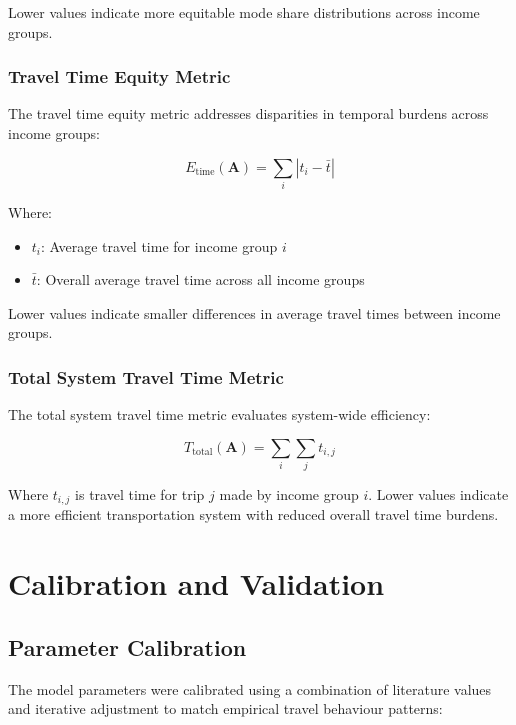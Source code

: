 Lower values indicate more equitable mode share distributions across income groups.

\subsubsection{Travel Time Equity Metric}
The travel time equity metric addresses disparities in temporal burdens across income groups:

\begin{equation}
E_{\text{time}}(\mathbf{A}) = \sum_{i} |t_i - \bar{t}|
\end{equation}

Where:
\begin{itemize}
    \item $t_i$: Average travel time for income group $i$
    \item $\bar{t}$: Overall average travel time across all income groups
\end{itemize}

Lower values indicate smaller differences in average travel times between income groups.

\subsubsection{Total System Travel Time Metric}
The total system travel time metric evaluates system-wide efficiency:

\begin{equation}
T_{\text{total}}(\mathbf{A}) = \sum_{i} \sum_{j} t_{i,j}
\end{equation}

Where $t_{i,j}$ is travel time for trip $j$ made by income group $i$. Lower values indicate a more efficient transportation system with reduced overall travel time burdens.


\section{Calibration and Validation}
\label{app:calibration_validation}

\subsection{Parameter Calibration}
The model parameters were calibrated using a combination of literature values and iterative adjustment to match empirical travel behaviour patterns:

